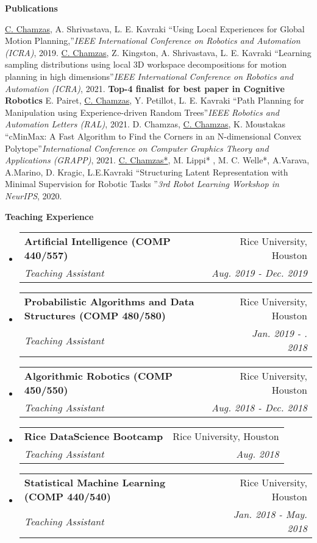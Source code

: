 \documentclass[letterpaper,11pt]{article}
\makeatletter
\newcommand{\resheading}[1]{{\large \colorbox{mygrey}{\begin{minipage}{\textwidth}{\textbf{#1 \vphantom{p\^{E}}}}\end{minipage}}}}
\newcommand{\ressubheading}[4]{
\begin{tabular*}{7.0in}{l@{\extracolsep{\fill}}r}
		\textbf{#1} & #2 \\
		\textit{#3} & \textit{#4} \\
\end{tabular*}\vspace{-6pt}}
\makeatother
\begin{document}
\resheading{Publications }
\begingroup
	\renewcommand{\section}[2]{}%
\begin{thebibliography}{9}

	\underline{C. Chamzas}, A. Shrivastava, L. E. Kavraki
	``Using Local Experiences for Global Motion Planning,''\textit{IEEE International Conference on Robotics and Automation (ICRA)}, 2019.
    \underline{C. Chamzas}, Z. Kingston, A. Shrivastava, L. E. Kavraki
	``Learning sampling distributions using local 3D workspace decompositions for motion planning in high dimensions''\textit{IEEE International Conference on Robotics and Automation (ICRA)}, 2021. \textbf{Top-4 finalist for best paper in Cognitive Robotics} 
	E. Pairet, \underline{C. Chamzas}, Y. Petillot, L. E. Kavraki
	``Path Planning for Manipulation using Experience-driven Random Trees''\textit{IEEE Robotics and Automation Letters (RAL)}, 2021.
	D. Chamzas, \underline{C. Chamzas}, K. Moustakas
	``cMinMax: A Fast Algorithm to Find the Corners in an N-dimensional Convex Polytope''\textit{International Conference on Computer Graphics Theory and Applications (GRAPP)}, 2021. 
	\underline{C. Chamzas*}, M. Lippi* , M. C. Welle*, A.Varava, A.Marino, D. Kragic, L.E.Kavraki ``Structuring Latent Representation with Minimal Supervision for Robotic Tasks ''\textit{3rd Robot Learning Workshop in NeurIPS}, 2020. 
	\end{thebibliography}
	\endgroup
\pagebreak
\resheading{Teaching Experience}
\begin{itemize}
	\item
	\ressubheading{Artificial Intelligence (COMP  440/557) }
	{Rice University, Houston}{Teaching Assistant}
	{Aug. 2019 - Dec. 2019}
	\item
	\ressubheading{Probabilistic Algorithms and Data Structures (COMP  480/580)}
	{Rice University, Houston}{Teaching Assistant}
	{Jan. 2019 - . 2018}
	\item
	\ressubheading{Algorithmic Robotics (COMP  450/550) }
	{Rice University, Houston}{Teaching Assistant}
	{Aug. 2018 - Dec. 2018}
	\item
	\ressubheading{Rice DataScience Bootcamp}
	{Rice University, Houston}{Teaching Assistant}
	{Aug. 2018}
	\item
	\ressubheading{Statistical Machine Learning (COMP 440/540)}
	{Rice University, Houston}{Teaching Assistant}
	{Jan. 2018 - May. 2018}
\end{itemize}
\end{document}

